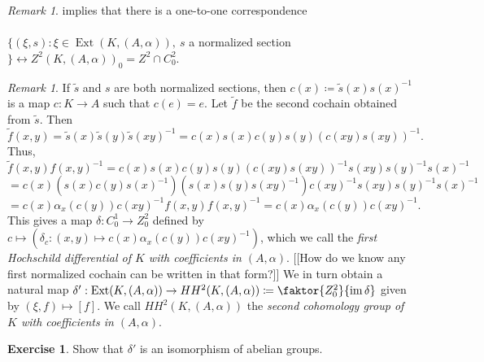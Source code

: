 \documentclass[10pt,letterpaper,cm]{nupset}
\theoremstyle{definition}
\theoremstyle{theorem}
\newtheorem{exercise}[definition]{Exercise}
\theoremstyle{remark}
\newtheorem{remark}[definition]{Remark}
\newcommand{\1}{\mathbf{1}}
\newcommand{\0}{\vec 0}
\DeclareMathOperator{\ext}{Ext}
\DeclareMathOperator{\im}{im}
\begin{document}
\begin{remark}
 implies that there is a one-to-one correspondence 
\\ \\
$\{(\xi, s) : \xi \in \ext(K, (A, \alpha)), \ s$ a normalized section$\} \longleftrightarrow Z^2(K, (A, \alpha))_0 = Z^2 \cap C^2_0$.
\end{remark}

\begin{remark}
If $\tilde{s}$ and $s$ are both normalized sections, then $c(x)\coloneqq \tilde{s}(x)s(x)^{-1}$ is a map $c : K \to A$ such that $c(e) =e$. Let $\tilde{f}$ be the second cochain obtained from $\tilde{s}$. Then  $\tilde{f}(x, y) = \tilde{s}(x)\tilde{s}(y)\tilde{s}(xy)^{-1} =c(x)s(x)c(y)s(y)(c(xy)s(xy))^{-1}.$ Thus, 
$$\tilde{f}(x, y)f(x,y)^{-1} = c(x)s(x)c(y)s(y)(c(xy)s(xy))^{-1}s(xy)s(y)^{-1}s(x)^{-1}$$ $$ = c(x)(s(x)c(y)s(x)^{-1})(s(x)s(y)s(xy)^{-1})c(xy)^{-1}s(xy)s(y)^{-1}s(x)^{-1}$$ $$ = c(x)\alpha_x(c(y))c(xy)^{-1}f(x,y)f(x,y)^{-1} =c(x)\alpha_x(c(y))c(xy)^{-1}. $$
This gives a map $\delta: C^1_0 \to Z^2_0$ defined by $c \mapsto (\delta_c : (x, y) \mapsto   c(x)\alpha_x(c(y))c(xy)^{-1})$, which we call the \textit{first Hochschild differential of $K$ with coefficients in $(A, \alpha)$}. {[[How do we know any first normalized cochain can be written in that form?]]}
We in turn obtain a natural map $\delta': \ext(K, (A, \alpha)) \to HH^2(K, (A, \alpha)) \coloneqq  \faktor{Z^2_0}{\im \delta}$ given by $(\xi, f) \mapsto [f]$. We call $HH^2(K, (A, \alpha))$ the \textit{second cohomology group of $K$ with coefficients in $(A, \alpha)$}.
\end{remark}

\begin{exercise}
Show that $\delta '$ is an isomorphism of abelian groups.
\end{exercise}
\end{document}
